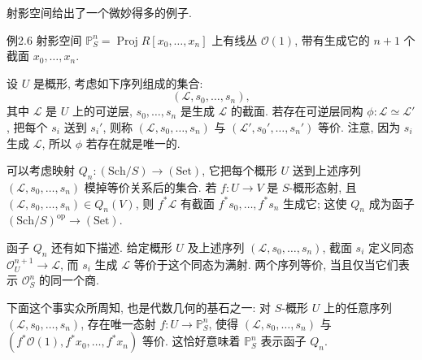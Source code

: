 射影空间给出了一个微妙得多的例子.

\begin{origstatement}{例}{2.6}\label{ch02:ex26}
射影空间 $\mathbb P^n_S=\operatorname{Proj}R[x_0,\ldots,x_n]$ 上有线丛 $\mathcal O(1)$, 带有生成它的 $n+1$ 个截面 $x_0,\ldots,x_n$.

设 $U$ 是概形, 考虑如下序列组成的集合:
\[
(\mathcal L,s_0,\ldots,s_n),
\]
其中 $\mathcal L$ 是 $U$ 上的可逆层, $s_0,\ldots,s_n$ 是生成 $\mathcal L$ 的截面. 若存在可逆层同构 $\phi:\mathcal L\simeq\mathcal L'$, 把每个 $s_i$ 送到 $s_i'$, 则称 $(\mathcal L,s_0,\ldots,s_n)$ 与 $(\mathcal L',s_0',\ldots,s_n')$ 等价. 注意, 因为 $s_i$ 生成 $\mathcal L$, 所以 $\phi$ 若存在就是唯一的.

可以考虑映射 $Q_n:(\mathrm{Sch}/S)\to(\mathrm{Set})$, 它把每个概形 $U$ 送到上述序列 $(\mathcal L,s_0,\ldots,s_n)$ 模掉等价关系后的集合. 若 $f:U\to V$ 是 $S$-概形态射, 且 $(\mathcal L,s_0,\ldots,s_n)\in Q_n(V)$, 则 $f^*\mathcal L$ 有截面 $f^*s_0,\ldots,f^*s_n$ 生成它; 这使 $Q_n$ 成为函子 $(\mathrm{Sch}/S)^{\mathrm{op}}\to(\mathrm{Set})$.

函子 $Q_n$ 还有如下描述. 给定概形 $U$ 及上述序列 $(\mathcal L,s_0,\ldots,s_n)$, 截面 $s_i$ 定义同态 $\mathcal O_U^{n+1}\to\mathcal L$, 而 $s_i$ 生成 $\mathcal L$ 等价于这个同态为满射. 两个序列等价, 当且仅当它们表示 $\mathcal O_S^n$ 的同一个商.

下面这个事实众所周知, 也是代数几何的基石之一: 对 $S$-概形 $U$ 上的任意序列 $(\mathcal L,s_0,\ldots,s_n)$, 存在唯一态射 $f:U\to\mathbb P^n_S$, 使得 $(\mathcal L,s_0,\ldots,s_n)$ 与 $(f^*\mathcal O(1),f^*x_0,\ldots,f^*x_n)$ 等价. 这恰好意味着 $\mathbb P^n_S$ 表示函子 $Q_n$.
\end{origstatement}

